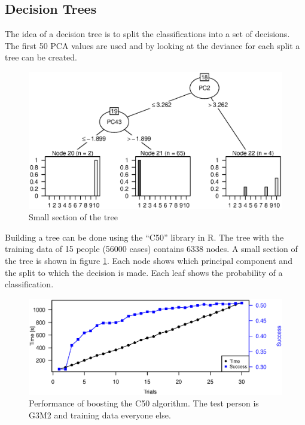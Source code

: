 \subsection{Decision Trees}

The idea of a decision tree is to split the classifications into a set of decisions.
The first 50 PCA values are used and by looking at the deviance for each split a tree can be created.

\begin{figure}[h]
\includegraphics[width = \textwidth]{graphics/tree_section}
\caption{Small section of the tree}
\label{fig:tree_section}
\end{figure}

Building a tree can be done using the ``C50'' library in R.
The tree with the training data of 15 people (56000 cases) contains 6338 nodes.
A small section of the tree is shown in figure \ref{fig:tree_section}.
Each node shows which principal component and the split to which the decision is made.
Each leaf shows the probability of a classification.

\begin{figure}[H]
\includegraphics[width = \textwidth]{graphics/tree_timing_entropy}
\caption{Performance of boosting the C50 algorithm. The test person is G3M2 and training data everyone else.}
\label{fig:tree_timing}
\end{figure}

